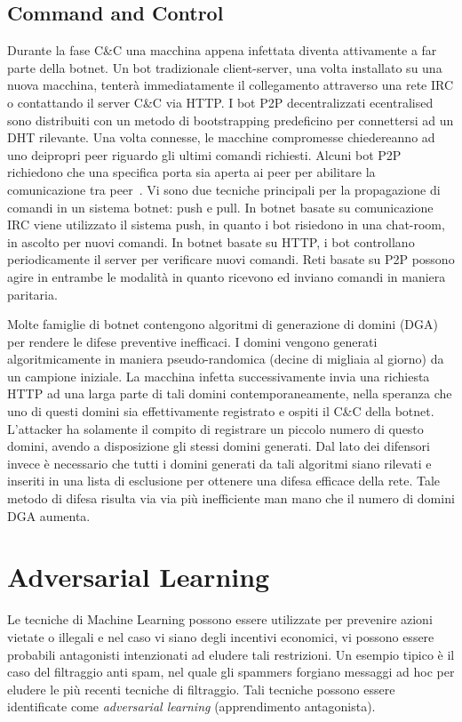 \subsection{Command and Control}
Durante la fase C\&C una macchina appena infettata diventa attivamente a far parte della botnet. Un bot tradizionale client-server, una volta installato su una nuova macchina, tenterà immediatamente il collegamento attraverso una rete IRC o contattando il server C\&C via HTTP.
I bot P2P decentralizzati ecentralised sono distribuiti con un metodo di bootstrapping predeficino per connettersi ad un DHT rilevante. Una volta connesse, le macchine compromesse chiedereanno ad uno deipropri peer riguardo gli ultimi comandi richiesti. Alcuni bot P2P richiedono che una specifica porta sia aperta ai peer per abilitare la comunicazione tra peer~\cite{p2pbots}. 
Vi sono due tecniche principali per la propagazione di comandi in un sistema botnet: push e pull.
In botnet basate su comunicazione IRC viene utilizzato il sistema push, in quanto i bot risiedono in una chat-room, in ascolto per nuovi comandi. 
In botnet basate su HTTP, i bot controllano periodicamente il server per verificare nuovi comandi. 
Reti basate su P2P possono agire in entrambe le modalità in quanto ricevono ed inviano comandi in maniera paritaria.


Molte famiglie di botnet contengono algoritmi di generazione di domini (DGA) per rendere le difese preventive inefficaci. I domini vengono generati algoritmicamente in maniera pseudo-randomica (decine di migliaia al giorno) da un campione iniziale. La macchina infetta successivamente invia una richiesta HTTP ad una larga parte di tali domini contemporaneamente, nella speranza che uno di questi domini sia effettivamente registrato e ospiti il C\&C della botnet. L'attacker ha solamente il compito di registrare un piccolo numero di questo domini, avendo a disposizione gli stessi domini generati. Dal lato dei difensori invece è necessario che tutti i domini generati da tali algoritmi siano rilevati e inseriti in una lista di esclusione per ottenere una difesa efficace della rete. Tale metodo di difesa risulta via via più inefficiente man mano che il numero di domini DGA aumenta.

\newpage
\section{Adversarial Learning}
\label{sec:advlearning}
Le tecniche di Machine Learning possono essere utilizzate per prevenire azioni vietate o illegali e nel caso vi siano degli incentivi economici, vi possono essere probabili antagonisti intenzionati ad eludere tali restrizioni. Un esempio tipico è il caso del filtraggio anti spam, nel quale gli spammers forgiano messaggi ad hoc per eludere le più recenti tecniche di filtraggio. Tali tecniche possono essere identificate come \textit{adversarial learning} (apprendimento antagonista).

